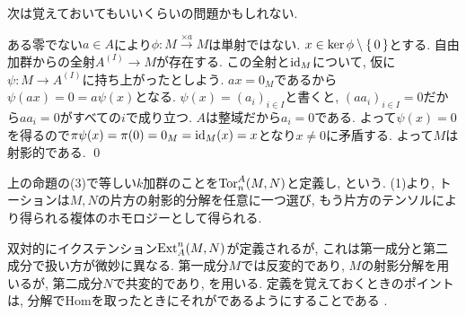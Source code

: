 次は覚えておいてもいいくらいの問題かもしれない.
\begin{egans}
ある零でない$a\in A$により$\phi: M\xrightarrow{\times a}M$は単射ではない. $x\in \ker{\phi}\setminus{\set{0}}$とする. 自由加群からの全射$A^{(I)}\to M$が存在する. この全射と$\mathrm{id}_{M}$について,  仮に$\psi:M\to A^{(I)}$に持ち上がったとしよう. $ax = 0_M$であるから$\psi(ax) = 0 = a\psi(x)$となる. $\psi(x) = (a_i)_{i\in I}$と書くと, $(aa_i)_{i\in I} = 0$だから$aa_i = 0$がすべての$i$で成り立つ. $A$は整域だから$a_i = 0$である. よって$\psi(x) = 0$を得るので$\pi\psi(x) = \pi (0) = 0_M = \mathrm{id}_M(x)= x$となり$x\neq 0$に矛盾する. よって$M$は射影的である. \qed

\end{egans}


\begin{defn}
上の命題の(3)で等しい$k$加群のことを$\mathrm{Tor}^{A}_{n}(M,N)$と定義し, という. (1)より, トーションは$M,N$の片方の射影的分解を任意に一つ選び, もう片方のテンソルにより得られる複体のホモロジーとして得られる.
\end{defn}
双対的にイクステンション$\mathrm{Ext}^{n}_{A}(M,N)$が定義されるが, これは第一成分と第二成分で扱い方が微妙に異なる. 第一成分$M$では反変的であり, $M$の射影分解を用いるが, 第二成分$N$で共変的であり, を用いる. 定義を覚えておくときのポイントは, 分解でHomを取ったときにそれがであるようにすることである
.

